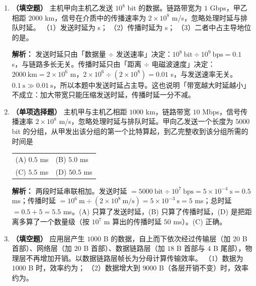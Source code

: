 \begin{enumerate}
\vspace{8pt}

\item \textbf{（填空题）} 主机甲向主机乙发送 $10^{8}$ bit 的数据。链路带宽为 $1$ Gbps，甲乙相距 $2000$ km，信号在介质中的传播速率为 $2\times 10^{8}$ m/s，忽略处理时延与排队时延。
（1）发送时延为\underline{\hspace{2.2cm}} s；
（2）传播时延为\underline{\hspace{2.2cm}} s；
（3）二者中占主导地位的是\underline{\hspace{2.2cm}}。

\ifshowsolutions\par\noindent\textbf{解析：} 发送时延只由「数据量 $\div$ 发送速率」决定：$10^{8}\ \text{bit}\div 10^{9}\ \text{bps}=0.1$ s，与链路多长无关。传播时延只由「距离 $\div$ 电磁波速度」决定：$2000\ \text{km}=2\times10^{6}$ m，$2\times10^{6}\div(2\times10^{8})=0.01$ s，与发送速率无关。$0.1\ \text{s}\gg 0.01\ \text{s}$，所以本题中发送时延占主导。这也说明「带宽越大时延越小」不成立：加大带宽只能压缩发送时延，传播时延一分不减。\else \answerarea[4] \fi

\vspace{8pt}

\item \textbf{（单项选择题）} 主机甲与主机乙相距 $1000$ km，链路带宽 $10$ Mbps，信号传播速率 $2\times10^{8}$ m/s，忽略处理时延与排队时延。甲向乙发送一个长度为 $5000$ bit 的分组，从甲发出该分组的第一个比特算起，到乙完整收到该分组所需的时间是
\begin{center}
\begin{tabular}{ll}
(A) $0.5$ ms & (B) $5.0$ ms \\[4pt]
(C) $5.5$ ms & (D) $50.5$ ms
\end{tabular}
\end{center}

\ifshowsolutions\par\noindent\textbf{解析：} 两段时延串联相加。发送时延 $=5000\ \text{bit}\div 10^{7}\ \text{bps}=5\times10^{-4}\ \text{s}=0.5$ ms；传播时延 $=10^{6}\ \text{m}\div(2\times10^{8}\ \text{m/s})=5\times10^{-3}\ \text{s}=5$ ms；总时延 $=0.5+5=5.5$ ms。(A) 只算了发送时延，(B) 只算了传播时延，(D) 是把距离多算了一个数量级（按 $10^{7}$ m 算出的传播时延 $50$ ms）。(C) 正确。\else \answerarea \fi

\vspace{8pt}

\item \textbf{（填空题）} 应用层产生 $1000$ B 的数据，自上而下依次经过传输层（加 $20$ B 首部）、网络层（加 $20$ B 首部）、数据链路层（加 $18$ B 首部与 $4$ B 尾部），物理层不再增加开销。以数据链路层帧长为分母计算传输效率。
（1）数据为 $1000$ B 时，效率约为\underline{\hspace{2.2cm}}；
（2）数据增大到 $9000$ B（各层开销不变）时，效率约为\underline{\hspace{2.2cm}}。


\end{enumerate}
